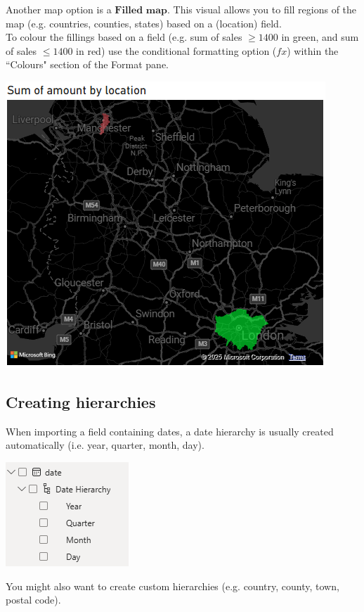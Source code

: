 \documentclass[10pt, openany, twocolumn]{book}
\begin{document}
Another map option is a $\textbf{Filled map}$. This visual allows you to fill regions of the map (e.g. countries, counties, states) based on a (location) field. \\

To colour the fillings based on a field (e.g. sum of sales $\geq 1400$ in green, and sum of sales $\leq 1400$ in red) use the conditional formatting option ($fx$) within the ``Colours" section of the Format pane.

\begin{center}
\includegraphics[width=0.92\columnwidth]{images/filled_map.png}
\end{center}


\subsection*{Creating hierarchies}

When importing a field containing dates, a date hierarchy is usually created automatically (i.e. year, quarter, month, day). 
\begin{center}
\includegraphics[width=0.4\columnwidth]{images/date_hierarchy.png}
\end{center}
You might also want to create custom hierarchies (e.g. country, county, town, postal code). \\
\end{document}
